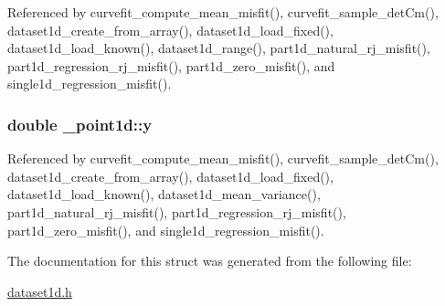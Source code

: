 Referenced by curvefit\+\_\+compute\+\_\+mean\+\_\+misfit(), curvefit\+\_\+sample\+\_\+det\+Cm(), dataset1d\+\_\+create\+\_\+from\+\_\+array(), dataset1d\+\_\+load\+\_\+fixed(), dataset1d\+\_\+load\+\_\+known(), dataset1d\+\_\+range(), part1d\+\_\+natural\+\_\+rj\+\_\+misfit(), part1d\+\_\+regression\+\_\+rj\+\_\+misfit(), part1d\+\_\+zero\+\_\+misfit(), and single1d\+\_\+regression\+\_\+misfit().

\subsubsection[{\texorpdfstring{y}{y}}]{\setlength{\rightskip}{0pt plus 5cm}double \+\_\+point1d\+::y}\hypertarget{struct__point1d_abc89203bf5b6194fc3661e45b7b8dfa3}{}\label{struct__point1d_abc89203bf5b6194fc3661e45b7b8dfa3}


Referenced by curvefit\+\_\+compute\+\_\+mean\+\_\+misfit(), curvefit\+\_\+sample\+\_\+det\+Cm(), dataset1d\+\_\+create\+\_\+from\+\_\+array(), dataset1d\+\_\+load\+\_\+fixed(), dataset1d\+\_\+load\+\_\+known(), dataset1d\+\_\+mean\+\_\+variance(), part1d\+\_\+natural\+\_\+rj\+\_\+misfit(), part1d\+\_\+regression\+\_\+rj\+\_\+misfit(), part1d\+\_\+zero\+\_\+misfit(), and single1d\+\_\+regression\+\_\+misfit().



The documentation for this struct was generated from the following file\+:\begin{DoxyCompactItemize}
\item 
\hyperlink{dataset1d_8h}{dataset1d.\+h}\end{DoxyCompactItemize}
